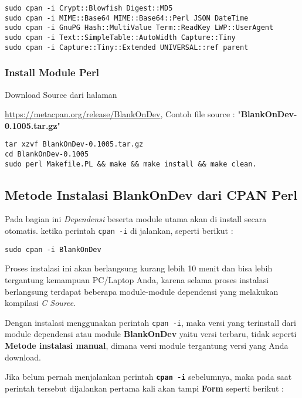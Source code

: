 \begin{lstlisting}[language=ShellBash]
sudo cpan -i Crypt::Blowfish Digest::MD5 
sudo cpan -i MIME::Base64 MIME::Base64::Perl JSON DateTime
sudo cpan -i GnuPG Hash::MultiValue Term::ReadKey LWP::UserAgent  
sudo cpan -i Text::SimpleTable::AutoWidth Capture::Tiny 
sudo cpan -i Capture::Tiny::Extended UNIVERSAL::ref parent
\end{lstlisting}

\subsubsection{Install Module Perl}
\noindent
\normalsize
Download Source dari halaman {\url{https://metacpan.org/release/BlankOnDev}, 
Contoh file source : "\textbf{BlankOnDev-0.1005.tar.gz}"

\begin{lstlisting}[language=ShellBash]
tar xzvf BlankOnDev-0.1005.tar.gz
cd BlankOnDev-0.1005
sudo perl Makefile.PL && make && make install && make clean.
\end{lstlisting}

\subsection{Metode Instalasi BlankOnDev dari CPAN Perl}
\noindent
Pada bagian ini \textit{Dependensi} beserta module utama akan di install secara otomatis. ketika perintah \texttt{cpan -i} di jalankan, seperti berikut :

\begin{lstlisting}[language=ShellBash]
sudo cpan -i BlankOnDev
\end{lstlisting}

\noindent
Proses instalasi ini akan berlangsung kurang lebih 10 menit dan bisa lebih tergantung kemampuan PC/Laptop Anda, karena selama proses instalasi berlangsung terdapat beberapa module-module dependensi yang melakukan kompilasi \textit{C Source}. 

\noindent
Dengan instalasi menggunakan perintah \texttt{cpan -i}, maka versi yang terinstall dari module dependensi atau module \textbf{BlankOnDev} yaitu versi terbaru, tidak seperti \textbf{Metode instalasi manual}, dimana versi module tergantung versi yang Anda download.

\noindent
Jika belum pernah menjalankan perintah \textbf{\texttt{cpan -i}} sebelumnya, maka pada saat perintah tersebut dijalankan pertama kali akan tampi \textbf{Form} seperti berikut :

}

